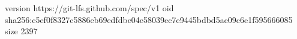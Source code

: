 version https://git-lfs.github.com/spec/v1
oid sha256:c5ef0f8327c5886eb69edfdbe04e58039ec7e9445bdbd5ae09c6e1f595666085
size 2397
